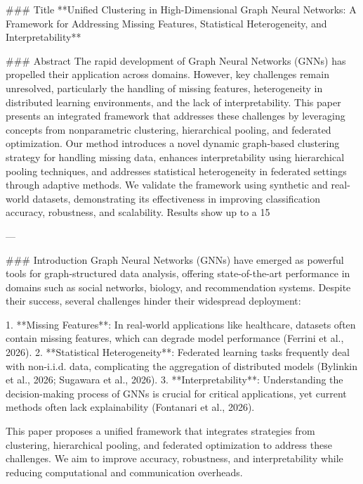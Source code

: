 ### Title  
**Unified Clustering in High-Dimensional Graph Neural Networks: A Framework for Addressing Missing Features, Statistical Heterogeneity, and Interpretability**

### Abstract  
The rapid development of Graph Neural Networks (GNNs) has propelled their application across domains. However, key challenges remain unresolved, particularly the handling of missing features, heterogeneity in distributed learning environments, and the lack of interpretability. This paper presents an integrated framework that addresses these challenges by leveraging concepts from nonparametric clustering, hierarchical pooling, and federated optimization. Our method introduces a novel dynamic graph-based clustering strategy for handling missing data, enhances interpretability using hierarchical pooling techniques, and addresses statistical heterogeneity in federated settings through adaptive methods. We validate the framework using synthetic and real-world datasets, demonstrating its effectiveness in improving classification accuracy, robustness, and scalability. Results show up to a 15%

---

### Introduction  
Graph Neural Networks (GNNs) have emerged as powerful tools for graph-structured data analysis, offering state-of-the-art performance in domains such as social networks, biology, and recommendation systems. Despite their success, several challenges hinder their widespread deployment:

1. **Missing Features**: In real-world applications like healthcare, datasets often contain missing features, which can degrade model performance (Ferrini et al., 2026).
2. **Statistical Heterogeneity**: Federated learning tasks frequently deal with non-i.i.d. data, complicating the aggregation of distributed models (Bylinkin et al., 2026; Sugawara et al., 2026).
3. **Interpretability**: Understanding the decision-making process of GNNs is crucial for critical applications, yet current methods often lack explainability (Fontanari et al., 2026).

This paper proposes a unified framework that integrates strategies from clustering, hierarchical pooling, and federated optimization to address these challenges. We aim to improve accuracy, robustness, and interpretability while reducing computational and communication overheads.

